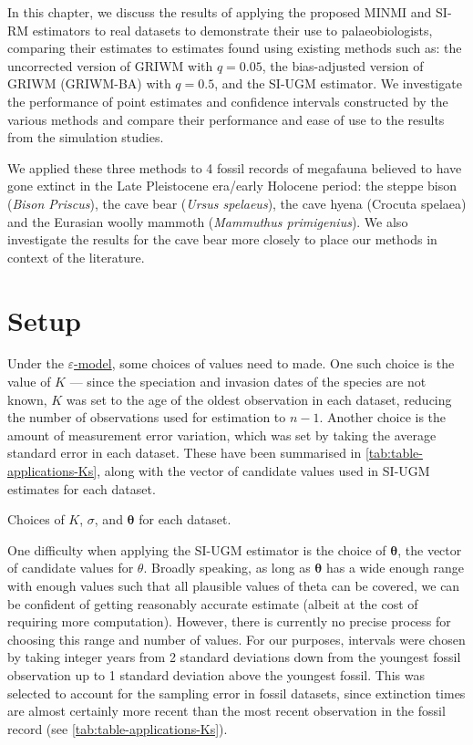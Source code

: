
In this chapter, we discuss the results of applying the proposed MINMI and SI-RM estimators to real datasets to demonstrate their use to palaeobiologists, comparing their estimates to estimates found using existing methods such as: the uncorrected version of GRIWM with $q=0.05$, the bias-adjusted version of GRIWM (GRIWM-BA) with $q=0.5$, and the SI-UGM estimator. We investigate the performance of point estimates and confidence intervals constructed by the various methods and compare their performance and ease of use to the results from the simulation studies.

We applied these three methods to 4 fossil records of megafauna believed to have gone extinct in the Late Pleistocene era/early Holocene period: the steppe bison (\textit{Bison Priscus}), the cave bear (\textit{Ursus spelaeus}), the cave hyena (Crocuta spelaea) and the Eurasian woolly mammoth (\textit{Mammuthus primigenius}). We also investigate the results for the cave bear more closely to place our methods in context of the literature.

\section{Setup}

Under the \hyperref[model: measurement-error]{$\varepsilon$-model}, some choices of values need to made. One such choice is the value of $K$ --- since the speciation and invasion dates of the species are not known, $K$ was set to the age of the oldest observation in each dataset, reducing the number of observations used for estimation to $n-1$. Another choice is the amount of measurement error variation, which was set by taking the average standard error in each dataset. These have been summarised in \autoref{tab:table-applications-Ks}, along with the vector of candidate values used in SI-UGM estimates for each dataset.
\begin{table}[ht]
    \centering
    \caption{Choices of $K$, $\sigma$, and $\bm{\theta}$ for each dataset.}
    
    \label{tab:table-applications-Ks}
    \vspace{-4mm}
\end{table}

One difficulty when applying the SI-UGM estimator is the choice of $\bm{\theta}$, the vector of candidate values for $\theta$. Broadly speaking, as long as $\bm{\theta}$ has a wide enough range with enough values such that all plausible values of theta can be covered, we can be confident of getting reasonably accurate estimate (albeit at the cost of requiring more computation). However, there is currently no precise process for choosing this range and number of values. For our purposes, intervals were chosen by taking integer years from 2 standard deviations down from the youngest fossil observation up to 1 standard deviation above the youngest fossil. This was selected to account for the sampling error in fossil datasets, since extinction times are almost certainly more recent than the most recent observation in the fossil record (see \autoref{tab:table-applications-Ks}).

